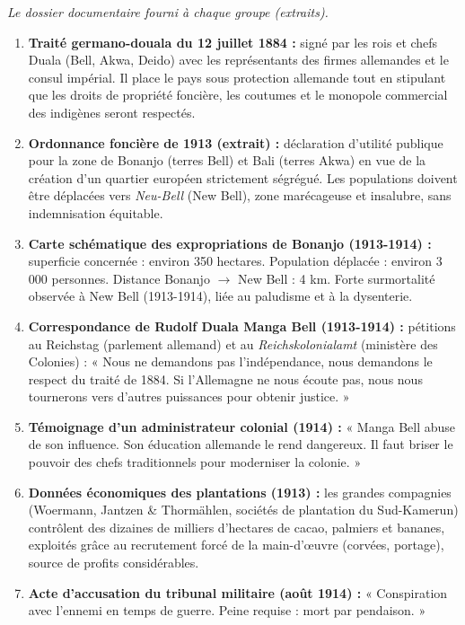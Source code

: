 \documentclass[11pt]{article}
\begin{document}
\emph{Le dossier documentaire fourni à chaque groupe (extraits).}
\begin{enumerate}
    \item \textbf{Traité germano-douala du 12 juillet 1884 :} signé par les rois et chefs Duala (Bell, Akwa, Deido) avec les représentants des firmes allemandes et le consul impérial. Il place le pays sous protection allemande tout en stipulant que les droits de propriété foncière, les coutumes et le monopole commercial des indigènes seront respectés.
    \item \textbf{Ordonnance foncière de 1913 (extrait) :} déclaration d'utilité publique pour la zone de Bonanjo (terres Bell) et Bali (terres Akwa) en vue de la création d'un quartier européen strictement ségrégué. Les populations doivent être déplacées vers \emph{Neu-Bell} (New Bell), zone marécageuse et insalubre, sans indemnisation équitable.
    \item \textbf{Carte schématique des expropriations de Bonanjo (1913-1914) :} superficie concernée : environ 350 hectares. Population déplacée : environ 3 000 personnes. Distance Bonanjo $\to$ New Bell : 4 km. Forte surmortalité observée à New Bell (1913-1914), liée au paludisme et à la dysenterie.
    \item \textbf{Correspondance de Rudolf Duala Manga Bell (1913-1914) :} pétitions au Reichstag (parlement allemand) et au \emph{Reichskolonialamt} (ministère des Colonies) : « Nous ne demandons pas l'indépendance, nous demandons le respect du traité de 1884. Si l'Allemagne ne nous écoute pas, nous nous tournerons vers d'autres puissances pour obtenir justice. »
    \item \textbf{Témoignage d'un administrateur colonial (1914) :} « Manga Bell abuse de son influence. Son éducation allemande le rend dangereux. Il faut briser le pouvoir des chefs traditionnels pour moderniser la colonie. »
    \item \textbf{Données économiques des plantations (1913) :} les grandes compagnies (Woermann, Jantzen \& Thormählen, sociétés de plantation du Sud-Kamerun) contrôlent des dizaines de milliers d'hectares de cacao, palmiers et bananes, exploités grâce au recrutement forcé de la main-d'œuvre (corvées, portage), source de profits considérables.
    \item \textbf{Acte d'accusation du tribunal militaire (août 1914) :} « Conspiration avec l'ennemi en temps de guerre. Peine requise : mort par pendaison. »
\end{enumerate}
\end{document}
